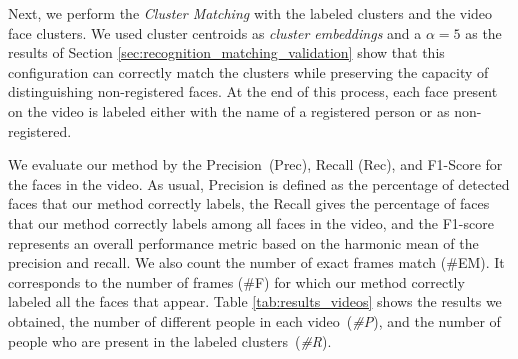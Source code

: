 Next, we perform the \emph{Cluster Matching} with the labeled clusters and the video face clusters.
We used cluster centroids as \emph{cluster embeddings} and a $\alpha=5$ as the results of Section \ref{sec:recognition_matching_validation} show that this configuration can correctly match the clusters while preserving the capacity of distinguishing non-registered faces.
At the end of this process, each face present on the video is labeled either with the name of a registered person or as non-registered.

We evaluate our method by the Precision~(Prec), Recall (Rec), and F1-Score for the faces in the video. 
As usual, Precision is defined as the percentage of detected faces that our method correctly labels, 
the Recall gives the percentage of faces that our method correctly labels among all faces in the video, and 
the F1-score represents an overall performance metric based on the harmonic mean of the precision and recall.
We also count the number of exact frames match (\#EM). It corresponds to the number of frames (\#F) for which our method correctly labeled all the faces that appear. %
Table \ref{tab:results_videos} shows the results we obtained, the number of different people in each video~(\emph{\#P}), and the number of people who are present in the labeled clusters~(\emph{\#R}).

